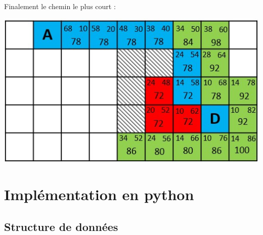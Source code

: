 Finalement le chemin le plus court :

\begin{center}
\includegraphics[scale=0.8]{images/quadrifinal.jpg}
\end{center}

\section{Implémentation en python}

\subsection{Structure de données}

%


